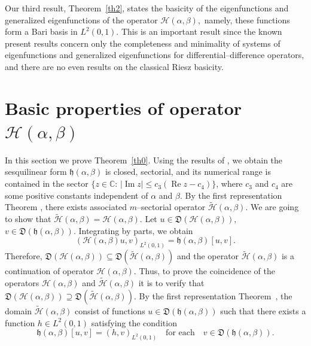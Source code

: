 \documentclass[10pt, a4paper]{article}
\theoremstyle{plain}
\theoremstyle{definition}
\numberwithin{equation}{section}
\def\a{\alpha}
\def\b{\beta}
\def\Op{\mathcal{H}}
\DeclareMathOperator{\RE}{Re}
\DeclareMathOperator{\IM}{Im}
\begin{document}
Our third result, Theorem~\ref{th2}, states the basicity of the eigenfunctions and generalized eigenfunctions of the operator $\Op(\a,\b),$ namely, these functions form  a Bari basis in $L^2(0, 1)$.  This is an important result since the known present results concern only the completeness and minimality of systems of eigenfunctions and
generalized eigenfunctions for differential--difference operators, and there are no even results on the  classical Riesz basicity.


 

\section{Basic properties of   operator $\mathcal{H}(\alpha, \beta)$}\label{sec3*}

In this section we prove Theorem~\ref{th0}. Using the results of \cite[Sect.~6, Thm.~4]{Borisov_Polyakov}, we obtain
the sesquilinear form $\mathfrak{h}(\alpha, \beta)$ is closed, sectorial, and its numerical range is contained
in the sector $\{z\in\mathds{C}:\, |\IM z|\leqslant c_{3}(\RE z-c_{4})\}$,
where $c_{3}$ and $c_{4}$ are some positive constants independent of $\alpha$ and $\beta$. By the first
representation Theorem \cite[Ch. V\!I, Sect.~2.1, Thm.~2.1]{Kato}, there exists
associated $m$--sectorial operator $\widetilde{\mathcal{H}}(\alpha, \beta)$. We are going to show that $\widetilde{\mathcal{H}}(\alpha, \beta)=\mathcal{H}(\alpha, \beta)$.
Let $u\in\mathfrak{D}(\mathcal{H}(\alpha, \beta))$, $v\in\mathfrak{D}(\mathfrak{h}(\alpha, \beta))$.
Integrating by parts, we obtain
\[
(\mathcal{H}(\alpha, \beta)u, v)_{L^2(0, 1)}=\mathfrak{h}(\alpha, \beta)[u, v].
\]
Therefore, $\mathfrak{D}(\mathcal{H}(\alpha, \beta))\subseteq\mathfrak{D}(\widetilde{\mathcal{H}}(\alpha, \beta))$
and the operator $\widetilde{\mathcal{H}}(\alpha, \beta)$ is a continuation of operator
$\mathcal{H}(\alpha, \beta)$. Thus, to prove the coincidence of the operators
$\mathcal{H}(\alpha, \beta)$ and $\widetilde{\mathcal{H}}(\alpha, \beta)$ it is
to verify that $\mathfrak{D}(\mathcal{H}(\alpha, \beta))
\supseteq\mathfrak{D}(\widetilde{\mathcal{H}}(\alpha, \beta))$.
By the first representation Theorem~\cite[Ch.~V\!I, Sect.~2.1, Thm.~2.1]{Kato},
the domain $\widetilde{\mathcal{H}}(\alpha, \beta)$ consist of functions
$u\in\mathfrak{D}(\mathfrak{h}(\alpha, \beta))$ such that there exists a function
$h\in L^2(0, 1)$ satisfying the condition
\begin{equation*}%
\mathfrak{h}(\alpha, \beta)[u, v]=(h, v)_{L^2(0, 1)}\quad\text{for each}\quad
v\in\mathfrak{D}(\mathfrak{h}(\alpha, \beta)).
\end{equation*}
\end{document}
